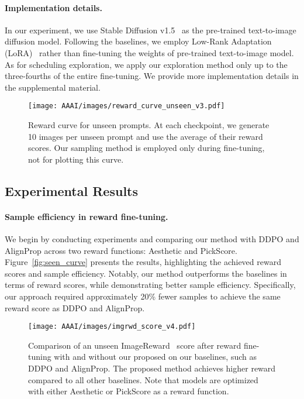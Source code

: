 \paragraph{Implementation details.}
In our experiment, we use Stable Diffusion v1.5~\cite{stable_diffusion} as the pre-trained text-to-image diffusion model. Following the baselines, we employ Low-Rank Adaptation (LoRA)~\cite{lora} rather than fine-tuning the weights of pre-trained text-to-image model. As for scheduling exploration, we apply our exploration method only up to the three-fourths of the entire fine-tuning. We provide more implementation details in the supplemental material.


\begin{figure*}[!t]
  \centering
  \texttt{[image: AAAI/images/reward\_curve\_unseen\_v3.pdf]}
  \caption{Reward curve for unseen prompts. At each checkpoint, we generate 10 images per unseen prompt and use the average of their reward scores. Our sampling method is employed only during fine-tuning, not for plotting this curve.}
  \label{fig:unseen_curve}
\end{figure*}


\subsection{Experimental Results}
\paragraph{Sample efficiency in reward fine-tuning.}
We begin by conducting experiments and comparing our method with DDPO and AlignProp across two reward functions: Aesthetic and PickScore. Figure~\ref{fig:seen_curve} presents the results, highlighting the achieved reward scores and sample efficiency. Notably, our method outperforms the baselines in terms of reward scores, while demonstrating better sample efficiency. Specifically, our approach required approximately 20\% fewer samples to achieve the same reward score as DDPO and AlignProp. 


\begin{figure}[t]
  \centering
  \texttt{[image: AAAI/images/imgrwd\_score\_v4.pdf]}
  \caption{
  Comparison of an unseen ImageReward~\cite{imagereward} score after reward fine-tuning with and without our proposed \metabbr on our baselines, such as DDPO and AlignProp. The proposed method \metabbr achieves higher reward compared to all other baselines. 
  Note that models are optimized with either Aesthetic or PickScore as a reward function. 
  }
  \label{fig:imgreward_score}
\end{figure}

